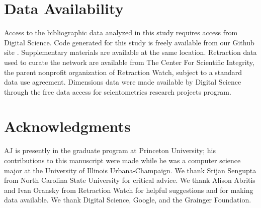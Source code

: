 \documentclass[12pt, oneside]{article}   	%
\begin{document}
\section*{Data Availability} Access to the bibliographic data analyzed in this study requires access from Digital Science. Code generated for this study is freely available from our Github site \citep{Liu_BL_2021}. Supplementary
materials are available at the same location. Retraction data used to curate the network are available from The Center For Scientific Integrity, the parent nonprofit organization of Retraction Watch, subject to a standard data use agreement. Dimensions data were made available by Digital Science through the free data access for scientometrics research projects program.
	
\section*{Acknowledgments} AJ is presently in the graduate program at Princeton University; his contributions to this manuscript were made while he was a computer science major at the University of Illinois Urbana-Champaign.
 We thank Srijan Sengupta from North Carolina State University for critical advice. We thank Alison Abritis and Ivan Oransky from Retraction Watch for helpful suggestions and for making data available. We thank Digital Science, Google, and the Grainger Foundation. 



\end{document}
